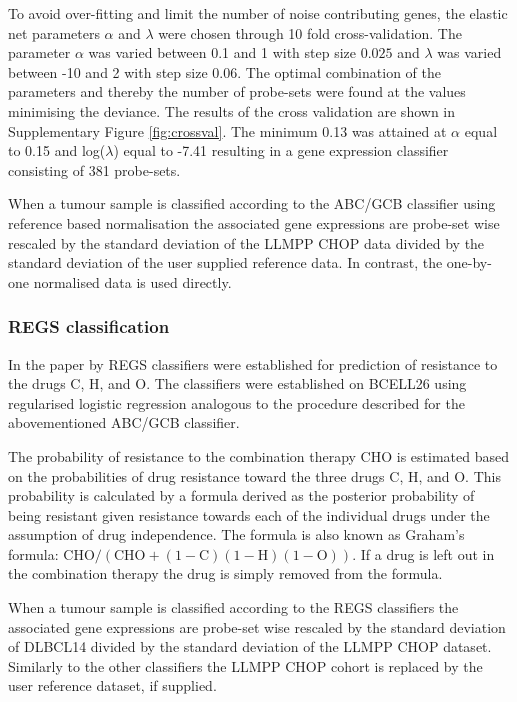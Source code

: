 \documentclass{article}
\begin{document}
To avoid over-fitting and limit the number of noise contributing genes, the elastic net parameters $\alpha$ and $\lambda$ were chosen through 10 fold cross-validation.
The parameter $\alpha$ was varied between 0.1 and 1 with step size $0.025$ and $\lambda$ was varied between -10 and 2 with step size $0.06$.
The optimal combination of the parameters and thereby the number of probe-sets were found at the values minimising the deviance.
The results of the cross validation are shown in Supplementary Figure \ref{fig:crossval}.
The minimum 0.13 was attained at $\alpha$ equal to 0.15 and log($\lambda$) equal to -7.41 resulting in a gene expression classifier consisting of 381 probe-sets.

When a tumour sample is classified according to the ABC/GCB classifier using reference based normalisation the associated gene expressions are probe-set wise rescaled by the standard deviation of the LLMPP CHOP data divided by the standard deviation of the user supplied reference data.
In contrast, the one-by-one normalised data is used directly.

\subsubsection{REGS classification}
In the paper by \citet{Falgreen2013c} REGS classifiers were established for prediction of resistance to the drugs C, H, and O.
The classifiers were established on BCELL26 using regularised logistic regression analogous to the procedure described for the abovementioned ABC/GCB classifier.

The probability of resistance to the combination therapy CHO is estimated based on the probabilities of drug resistance toward the three drugs C, H, and O.
This probability is calculated by a formula derived as the posterior probability of being resistant given resistance towards each of the individual drugs under the assumption of drug independence.
The formula is also known as Graham's formula: $\mbox{CHO}/(\mbox{CHO}+(1-\mbox{C})(1-\mbox{H})(1-\mbox{O}))$.
If a drug is left out in the combination therapy the drug is simply removed from the formula.

When a tumour sample is classified according to the REGS classifiers the associated gene expressions are probe-set wise rescaled by the standard deviation of DLBCL14 divided by the standard deviation of the LLMPP CHOP dataset.
Similarly to the other classifiers the LLMPP CHOP cohort is replaced by the user reference dataset, if supplied.
\end{document}

